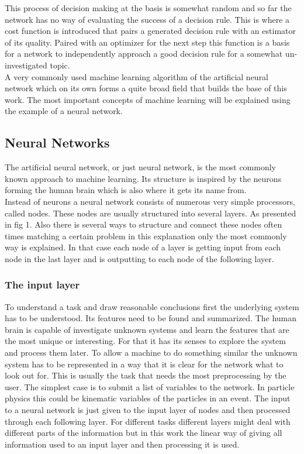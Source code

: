 This process of decision making at the basis is somewhat random and so far the network has no way of evaluating the success of a decision rule. This is where a cost function is introduced that pairs a generated decision rule with an estimator of its quality. Paired with an optimizer for the next step this function is a basis for a network to independently approach a good decision rule for a somewhat un-investigated topic.\\
A very commonly used machine learning algorithm of the artificial neural network which on its own forms a quite broad field that builds the base of this work. The most important concepts of machine learning will be explained using the example of a neural network.

\subsection{Neural Networks}

The artificial neural network, or just neural network, is the most commonly known approach to machine learning. Its structure is inspired by the neurons forming the human brain which is also where it gets its name from.\\
Instead of neurons a neural network consists of numerous very simple processors, called nodes. These nodes are usually structured into several layers. As presented in fig 1. Also there is several ways to structure and connect these nodes often times matching a certain problem in this explanation only the most commonly way is explained. In that case each node of a layer is getting input from each node in the last layer and is outputting to each node of the following layer.\\

\subsubsection{The input layer}

To understand a task and draw reasonable conclusions first the underlying system has to be understood. Its features need to be found and summarized. The human brain is capable of investigate unknown systems and learn the features that are the most unique or interesting. For that it has its senses to explore the system and process them later. To allow a machine to do something similar the unknown system has to be represented in a way that it is clear for the network what to look out for. This is usually the task that needs the most preprocessing by the user. The simplest case is to submit a list of variables to the network. In particle physics this could be kinematic variables of the particles in an event.
The input to a neural network is just given to the input layer of nodes and then processed through each following layer. For different tasks different layers might deal with different parts of the information but in this work the linear way of giving all information used to an input layer and then processing it is used.


